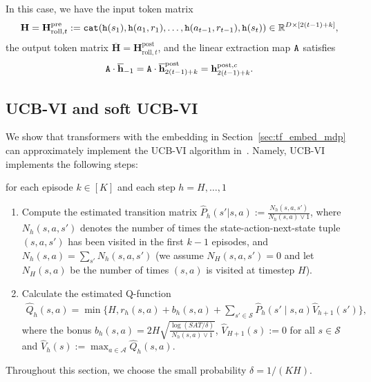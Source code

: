 \documentclass[10pt]{article}
\renewcommand{\bar}{\overline}
\newcommand{\<}{\left\langle}
\renewcommand{\>}{\right\rangle}
\newcommand{\R}{\mathbb{R}}
\newcommand{\pre}{{\mathrm{pre}}}
\newcommand{\post}{{\mathrm{post}}}
\newcommand{\partc}{{c}}
\newcommand{\state}{{s}}
\newcommand{\action}{{a}}
\newcommand{\reward}{{r}}
\newcommand{\totlen}{{T}}
\newcommand{\cat}{{\tt cat}}
\newcommand{\extractmap}{{\tt A}}
\newcommand{\embedmap}{{\tt h}}
\newcommand{\Numepi}{{K}}
\newcommand{\horizon}{{H}}
\newcommand{\statesp}{{\mathcal{S}}}
\newcommand{\actionsp}{{\mathcal{A}}}
\renewcommand{\horizon}{{H}}
\newcommand{\bonus}{{b}}
\newcommand{\tresttransit}{\widehat{P}}
\newcommand{\valuefun}{{V}}
\newcommand{\roll}{{\mathrm{roll}}}
\newcommand{\Numst}{{S}}
\newcommand{\Numact}{{A}}
\newcommand{\Numvi}{{N}}
\newcommand{\Qfun}{{Q}}
\newcommand{\trestQfun}{{\widehat{\Qfun}}}
\newcommand{\Vfun}{{\valuefun}}
\newcommand{\trestVfun}{{\widehat{\Vfun}}}
\def\bH{{\mathbf H}}
\def\bh{{\mathbf h}}
\begin{document}
In this case, we have the input token matrix  $$\bH=\bH^\pre_{\roll,t}: = \cat(\embedmap(\state_1), \embedmap(\action_1, \reward_1), \ldots, \embedmap(\action_{t-1}, \reward_{t-1}), \embedmap(\state_t)) \in \R^{D \times [2(t-1)+k]},$$ the output token matrix $\bar{\bH}=\bH^\post_{\roll,t}$, and the linear extraction map $\extractmap$  satisfies $$\extractmap\cdot\bar{\bh}_{-1}=\extractmap\cdot\bar{\bh}^\post_{2(t-1)+k}=\bh^{\post,\partc}_{2(t-1)+k}.$$ 



































\subsection{UCB-VI and soft UCB-VI}\label{sec:example_ucbvi}
We show that transformers with the embedding in Section~\ref{sec:tf_embed_mdp}  can approximately implement the  UCB-VI algorithm in~\cite{azar2017minimax}. Namely, UCB-VI implements the following steps:

for each episode $k\in[\Numepi]$ and each step $h=\horizon,\ldots,1$
\begin{enumerate}
    \item Compute the estimated transition matrix $\tresttransit_h(\state'|\state,\action):=   \frac{\Numvi_h(\state,\action,\state')}{\Numvi_h(\state,\action)\vee 1}$,  where $\Numvi_h(\state,\action,\state')$ denotes the number of times the state-action-next-state tuple $(\state,\action,\state')$ has been visited in the first $k-1$ episodes, and $\Numvi_h(\state,\action)=\sum_{\state'}\Numvi_h(\state,\action,\state')$ (we assume $\Numvi_\horizon(\state,\action,\state')=0$ and let $\Numvi_\horizon(\state,\action)$  be the number of times $(\state,\action)$ is visited at timestep $\horizon$).
    \item Calculate the estimated Q-function \begin{align*}
\trestQfun_h(\state,\action)=\min\{\horizon,\reward_h(\state,\action)+\bonus_h(\state,\action)+\sum_{\state'\in\statesp}\tresttransit_h(\state'\mid\state,\action)\trestVfun_{h+1}(\state')\},\end{align*}
where the bonus $\bonus_h(\state,\action)=2\horizon\sqrt{\frac{\log(\Numst\Numact\totlen/\delta)}{\Numvi_h(\state,\action)\vee1}}$,  $\trestVfun_{\horizon+1}(\state):=0$ for all $\state\in\statesp$ and $\trestVfun_h(\state):=\max_{\action\in\actionsp}\trestQfun_h(\state,\action)$. 
\end{enumerate} Throughout this section, we choose the small probability $\delta=1/(\Numepi\horizon)$. 
\end{document}
